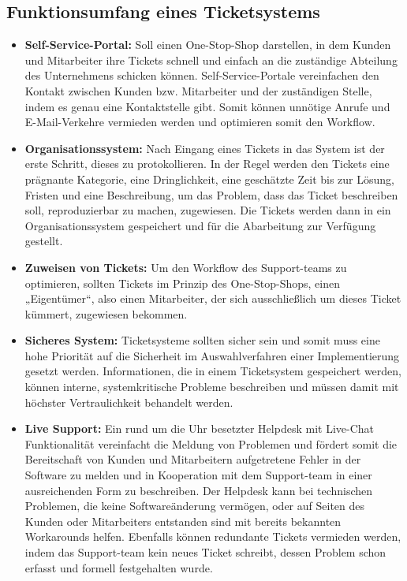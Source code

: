 \subsection{Funktionsumfang eines Ticketsystems}
\begin{itemize}
	\item \textbf{Self-Service-Portal:} Soll einen One-Stop-Shop darstellen, in dem Kunden und Mitarbeiter ihre Tickets schnell und einfach an die zuständige Abteilung des Unternehmens schicken können. Self-Service-Portale vereinfachen den Kontakt zwischen Kunden bzw. Mitarbeiter und der zuständigen Stelle, indem es genau eine Kontaktstelle gibt. Somit können unnötige Anrufe und E-Mail-Verkehre vermieden werden und optimieren somit den Workflow.
	\item \textbf{Organisationssystem:} Nach Eingang eines Tickets in das System ist der erste Schritt, dieses zu protokollieren. In der Regel werden den Tickets eine prägnante Kategorie, eine Dringlichkeit, eine geschätzte Zeit bis zur Lösung, Fristen und eine Beschreibung, um das Problem, dass das Ticket beschreiben soll, reproduzierbar zu machen, zugewiesen. Die Tickets werden dann in ein Organisationssystem gespeichert und für die Abarbeitung zur Verfügung gestellt.
	\item \textbf{Zuweisen von Tickets:} Um den Workflow des Support-teams zu optimieren, sollten Tickets im Prinzip des One-Stop-Shops, einen „Eigentümer“, also einen Mitarbeiter, der sich ausschließlich um dieses Ticket kümmert, zugewiesen bekommen.
	\item \textbf{Sicheres System:} Ticketsysteme sollten sicher sein und somit muss eine hohe Priorität auf die Sicherheit im Auswahlverfahren einer Implementierung gesetzt werden. Informationen, die in einem Ticketsystem gespeichert werden, können interne, systemkritische Probleme beschreiben und müssen damit mit höchster Vertraulichkeit behandelt werden.
	\item \textbf{Live Support:} Ein rund um die Uhr besetzter Helpdesk mit Live-Chat Funktionalität vereinfacht die Meldung von Problemen und fördert somit die Bereitschaft von Kunden und Mitarbeitern aufgetretene Fehler in der Software zu melden und in Kooperation mit dem Support-team in einer ausreichenden Form zu beschreiben. Der Helpdesk kann bei technischen Problemen, die keine Softwareänderung vermögen, oder auf Seiten des Kunden oder Mitarbeiters entstanden sind mit bereits bekannten Workarounds helfen. Ebenfalls können redundante Tickets vermieden werden, indem das Support-team kein neues Ticket schreibt, dessen Problem schon erfasst und formell festgehalten wurde.
\end{itemize}
